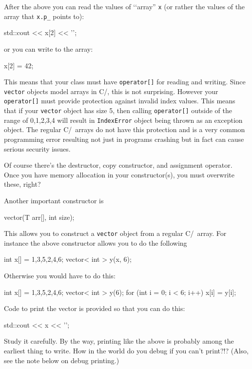After the above you can read the values of \lq\lq array'' \verb!x!
(or rather the values of the array that \verb!x.p_! points to):
\begin{console}[fontsize=\footnotesize]
std::cout << x[2] << '\n';
\end{console}
or you can write to the array:
{\small
\begin{console}
x[2] = 42;
\end{console}
}
This means that your class must have
\verb!operator[]! for reading and writing.
Since \verb!vector! objects model arrays in C/\cpp, this is not 
surprising.
However your \verb!operator[]! must provide protection
against invalid index values.
This means that if your \verb!vector! object has size 5,
then calling \verb!operator[]! outside of the
range of 0,1,2,3,4 will result in 
\verb!IndexError! object being thrown as an exception object.
The regular C/\cpp\ arrays do not have this protection
and is a very common programming error resulting not just in 
programs crashing but in fact can cause serious
security issues.

Of course there's the destructor, copy constructor, and assignment
operator.
Once you have memory allocation in your constructor(s), you must
overwrite these, right?

Another important constructor is
\begin{console}[fontsize=\footnotesize]
vector(T arr[], int size);
\end{console}
This allows you to construct a \verb!vector! object from a regular
C/\cpp\ array. For instance the above
constructor allows you to do the following
\begin{console}[fontsize=\footnotesize]
int x[] = {1,3,5,2,4,6};
vector< int > y(x, 6);
\end{console}
Otherwise you would have to do this:
\begin{console}[fontsize=\footnotesize]
int x[] = {1,3,5,2,4,6};
vector< int > y(6);
for (int i = 0; i < 6; i++)
{
    x[i] = y[i]; 
}
\end{console}

Code to print the vector is provided so that you can do this:
\begin{console}[fontsize=\footnotesize]
std::cout << x << '\n';
\end{console}
Study it carefully.
By the way, printing like the above is probably
among the earliest thing to write. 
How in the world do you debug if you can't print?!?
(Also, see the note below on debug printing.)

